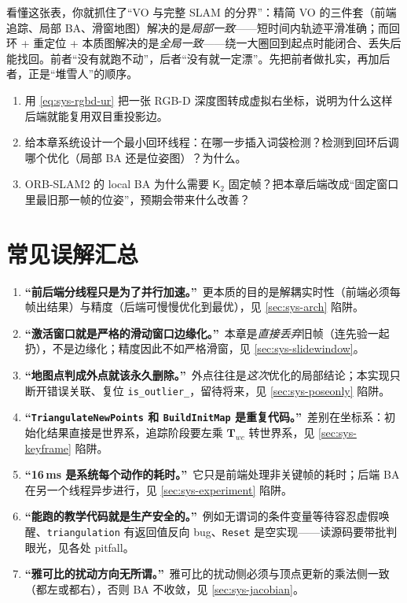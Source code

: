 \begin{insight}
看懂这张表，你就抓住了“VO 与完整 SLAM 的分界”：精简 VO 的三件套（前端追踪、局部 BA、滑窗地图）解决的是\emph{局部一致}——短时间内轨迹平滑准确；而回环 + 重定位 + 本质图解决的是\emph{全局一致}——绕一大圈回到起点时能闭合、丢失后能找回。前者“没有就跑不动”，后者“没有就一定漂”。先把前者做扎实，再加后者，正是“堆雪人”的顺序。
\end{insight}

\begin{practice}[练习]
\begin{enumerate}
  \item 用 \cref{eq:sys-rgbd-ur} 把一张 RGB-D 深度图转成虚拟右坐标，说明为什么这样后端就能复用双目重投影边。
  \item 给本章系统设计一个最小回环线程：在哪一步插入词袋检测？检测到回环后调哪个优化（局部 BA 还是位姿图）？为什么。
  \item ORB-SLAM2 的 local BA 为什么需要 $\mathsf{K}_2$ 固定帧？把本章后端改成“固定窗口里最旧那一帧的位姿”，预期会带来什么改善？
\end{enumerate}
\end{practice}

\section*{常见误解汇总}
\begin{enumerate}
  \item \textbf{“前后端分线程只是为了并行加速。”}\ 更本质的目的是解耦实时性（前端必须每帧出结果）与精度（后端可慢慢优化到最优），见 \cref{sec:sys-arch} 陷阱。
  \item \textbf{“激活窗口就是严格的滑动窗口边缘化。”}\ 本章是\emph{直接丢弃}旧帧（连先验一起扔），不是边缘化；精度因此不如严格滑窗，见 \cref{sec:sys-slidewindow}。
  \item \textbf{“地图点判成外点就该永久删除。”}\ 外点往往是\emph{这次}优化的局部结论；本实现只断开错误关联、复位 \texttt{is\_outlier\_}，留待将来，见 \cref{sec:sys-poseonly} 陷阱。
  \item \textbf{“\texttt{TriangulateNewPoints} 和 \texttt{BuildInitMap} 是重复代码。”}\ 差别在坐标系：初始化结果直接是世界系，追踪阶段要左乘 $\mathbf{T}_{wc}$ 转世界系，见 \cref{sec:sys-keyframe} 陷阱。
  \item \textbf{“16\,ms 是系统每个动作的耗时。”}\ 它只是前端处理非关键帧的耗时；后端 BA 在另一个线程异步进行，见 \cref{sec:sys-experiment} 陷阱。
  \item \textbf{“能跑的教学代码就是生产安全的。”}\ 例如无谓词的条件变量等待容忍虚假唤醒、\texttt{triangulation} 有返回值反向 bug、\texttt{Reset} 是空实现——读源码要带批判眼光，见各处 pitfall。
  \item \textbf{“雅可比的扰动方向无所谓。”}\ 雅可比的扰动侧必须与顶点更新的乘法侧一致（都左或都右），否则 BA 不收敛，见 \cref{sec:sys-jacobian}。
\end{enumerate}

